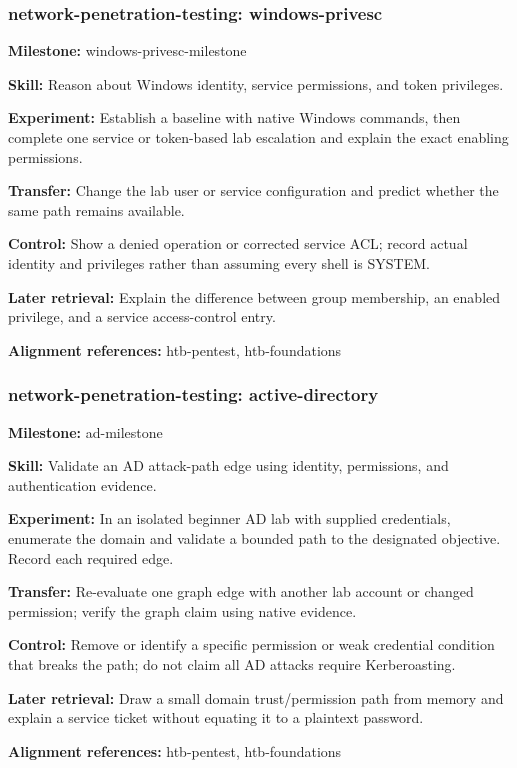 \subsubsection{network-penetration-testing: windows-privesc}
\noindent\textbf{Milestone:} windows-privesc-milestone\par
\noindent\textbf{Skill:} Reason about Windows identity, service permissions, and token privileges.\par
\noindent\textbf{Experiment:} Establish a baseline with native Windows commands, then complete one service or token-based lab escalation and explain the exact enabling permissions.\par
\noindent\textbf{Transfer:} Change the lab user or service configuration and predict whether the same path remains available.\par
\noindent\textbf{Control:} Show a denied operation or corrected service ACL; record actual identity and privileges rather than assuming every shell is SYSTEM.\par
\noindent\textbf{Later retrieval:} Explain the difference between group membership, an enabled privilege, and a service access-control entry.\par
\noindent\textbf{Alignment references:} htb-pentest, htb-foundations\par
\subsubsection{network-penetration-testing: active-directory}
\noindent\textbf{Milestone:} ad-milestone\par
\noindent\textbf{Skill:} Validate an AD attack-path edge using identity, permissions, and authentication evidence.\par
\noindent\textbf{Experiment:} In an isolated beginner AD lab with supplied credentials, enumerate the domain and validate a bounded path to the designated objective. Record each required edge.\par
\noindent\textbf{Transfer:} Re-evaluate one graph edge with another lab account or changed permission; verify the graph claim using native evidence.\par
\noindent\textbf{Control:} Remove or identify a specific permission or weak credential condition that breaks the path; do not claim all AD attacks require Kerberoasting.\par
\noindent\textbf{Later retrieval:} Draw a small domain trust/permission path from memory and explain a service ticket without equating it to a plaintext password.\par
\noindent\textbf{Alignment references:} htb-pentest, htb-foundations\par
